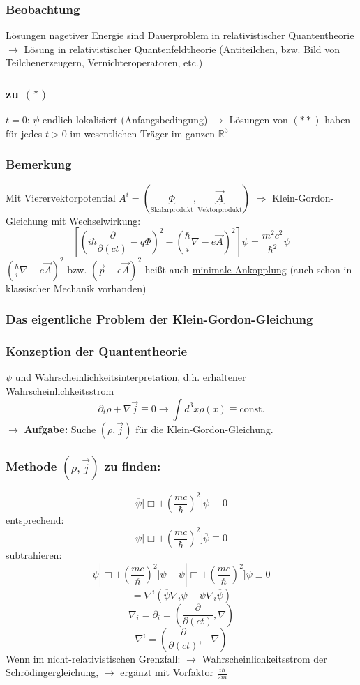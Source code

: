 \documentclass[twoside,a4paper]{scrartcl}
\newcommand{\R}{\mathbb{R}}
\renewcommand{\1}{\mathds{1}}
\newcommand{\Ra}{\Rightarrow}
\newcommand{\ra}{\rightarrow}
\renewcommand{\R}{\mathbb{R}}
\begin{document}
\subsubsection*{Beobachtung}
Lösungen nagetiver Energie sind Dauerproblem in relativistischer Quantentheorie $\ra$ Lösung in relativistischer Quantenfeldtheorie (Antiteilchen, bzw. Bild von Teilchenerzeugern, Vernichteroperatoren, etc.)
\subsubsection*{zu $(*)$}
$t=0$: $\psi$ endlich lokalisiert (Anfangsbedingung) $\ra$ Lösungen von $(**)$ haben für jedes $t>0$ im wesentlichen Träger im ganzen $\R^3$
\subsubsection*{Bemerkung}
Mit Vierervektorpotential $A^i=(\underbrace{\Phi}_{\mathrm{Skalarprodukt}},\underbrace{\vec A}_{\mathrm{Vektorprodukt}})$ $\Ra$ Klein-Gordon-Gleichung mit Wechselwirkung:
$$[(i\hbar \frac{\partial}{\partial (ct)}-q \Phi)^2-(\frac{\hbar}{i}\nabla -e \vec A)^2]\psi=\frac{m^2c^2}{\hbar^2}\psi$$
$(\frac{\hbar}{i}\nabla -e \vec A)^2$ bzw. $(\vec p-e \vec A)^2$ heißt auch \underline{minimale Ankopplung} (auch schon in klassischer Mechanik vorhanden)

\subsubsection*{Das eigentliche Problem der Klein-Gordon-Gleichung}
\subsubsection*{Konzeption der Quantentheorie}
$\psi$ und Wahrscheinlichkeitsinterpretation, d.h. erhaltener Wahrscheinlichkeitsstrom 
$$\partial_t \rho+\nabla \vec j\equiv 0 \ra \int d^3x \rho(x)\equiv \mathrm{const.}$$
$\ra$ \textbf{Aufgabe:} Suche $(\rho,\vec j)$ für die Klein-Gordon-Gleichung.
\subsubsection*{Methode $(\rho,\vec j)$ zu finden:}
$$\overline{\psi}|\Box+(\frac{mc}{\hbar})^2]\psi\equiv0$$
entsprechend:
$${\psi}|\Box+(\frac{mc}{\hbar})^2]\overline{\psi}\equiv0$$
subtrahieren:
$$\overline{\psi}|\Box+(\frac{mc}{\hbar})^2]\psi-{\psi}|\Box+(\frac{mc}{\hbar})^2]\overline{\psi}\equiv 0$$
$$=\nabla^i(\overline{\psi}\nabla_i \psi-\psi\nabla_i \overline{\psi})$$
$$\nabla_i=\partial_i=(\frac{\partial}{\partial (ct)},\nabla)$$
$$\nabla^i=(\frac{\partial}{\partial (ct)},-\nabla)$$
Wenn im nicht-relativistischen Grenzfall: $\ra$ Wahrscheinlichkeitsstrom der Schrödingergleichung, $\ra$ ergänzt mit Vorfaktor $\frac{i\hbar}{2m}$
\end{document}
